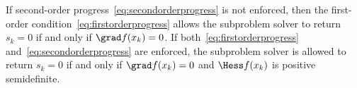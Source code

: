 %
\begin{lemma}\label{lem:termination}
	If second-order progress~\eqref{eq:secondorderprogress} is not enforced, then the first-order condition~\eqref{eq:firstorderprogress} allows the subproblem solver to return $s_k = 0$ if and only if $\grad f(x_k) = 0$.
	If both~\eqref{eq:firstorderprogress} and~\eqref{eq:secondorderprogress} are enforced, the subproblem solver is allowed to return $s_k = 0$ if and only if $\grad f(x_k) = 0$ and $\Hess f(x_k)$ is positive semidefinite.
\end{lemma}


